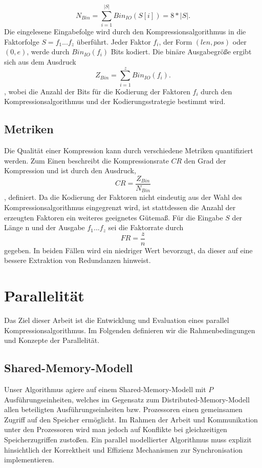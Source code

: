 \begin{equation}
    N_{Bin} = \sum_{i=1}^{|S|} Bin_{IO}(S[i]) = 8*|S|.
\end{equation}
Die eingelesene Eingabefolge wird durch den Kompressionsalgorithmus in die Faktorfolge $S=f_1...f_z$ überführt. Jeder Faktor $f_i$, der Form $(len, pos)$ oder $(0, e)$, werde 
durch $Bin_{IO}(f_i)$ Bits kodiert. Die binäre Ausgabegröße ergibt sich aus dem Ausdruck
\begin{equation}
    Z_{Bin} = \sum_{i=1}^{z} Bin_{IO}(f_i).
\end{equation}
, wobei die Anzahl der Bits für die Kodierung der Faktoren $f_i$ durch den Kompressionsalgorithmus und der Kodierungsstrategie bestimmt wird. 

\subsection{Metriken}
Die Qualität einer Kompression kann durch verschiedene Metriken quantifiziert werden. Zum Einen beschreibt die Kompressionsrate $CR$ den Grad der Kompression und ist durch den
Ausdruck, 
\begin{equation}
    CR = \frac{Z_{Bin}}{N_{Bin}}
\end{equation}
, definiert.
Da die Kodierung der Faktoren nicht eindeutig aus der Wahl des Kompressionsalgorithmus eingegrenzt wird, ist stattdessen die Anzahl der erzeugten Faktoren ein
weiteres geeignetes Gütemaß. Für die Eingabe $S$ der Länge n und der Ausgabe $f_1...f_z$ sei die Faktorrate durch
\begin{equation}
    FR = \frac{z}{n}
\end{equation}
gegeben. In beiden Fällen wird ein niedriger Wert bevorzugt, da dieser auf eine bessere Extraktion von Redundanzen hinweist.

\section{Parallelität}
Das Ziel dieser Arbeit ist die Entwicklung und Evaluation eines parallel Kompressionsalgorithmus. Im Folgenden definieren wir die Rahmenbedingungen und Konzepte der Parallelität.

\subsection{Shared-Memory-Modell}
Unser Algorithmus agiere auf einem Shared-Memory-Modell mit $P$ Ausführungseinheiten, welches im Gegensatz zum Distributed-Memory-Modell allen beteiligten Ausführungseinheiten bzw. 
Prozessoren einen gemeinsamen Zugriff auf den Speicher ermöglicht. Im Rahmen der Arbeit und Kommunikation unter den Prozessoren wird man jedoch auf Konflikte bei gleichzeitigen 
Speicherzugriffen zustoßen. Ein parallel modellierter Algorithmus muss explizit hinsichtlich der Korrektheit und Effizienz Mechanismen zur Synchronisation implementieren.

